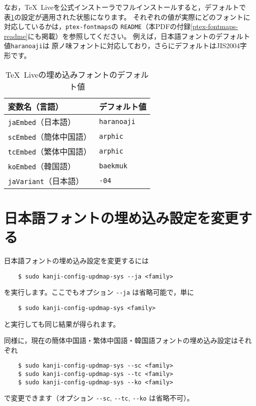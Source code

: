 \documentclass{jlreq}
\def\file#1{\texttt{#1}}
\def\command#1{\texttt{#1}}
\def\option#1{\texttt{-{}-#1}}
\def\TL{\TeX~Live}
\begin{document}
なお，\TL を公式インストーラでフルインストールすると，デフォルトで
表\ref{tldefault}の設定が適用された状態になります。
それぞれの値が実際にどのフォントに対応しているかは，\file{ptex-fontmaps}の
\file{README}（本PDFの付録\ref{ptex-fontmaps-readme}にも掲載）を参照してください。
例えば，日本語フォントのデフォルト値\command{haranoaji}は
原ノ味フォントに対応しており，さらにデフォルトはJIS2004字形です。
\begin{table}[h]
  \centering
  \caption{\TL の埋め込みフォントのデフォルト値}\label{tldefault}
  \begin{tabular}{m{}m{}}
  \hline
  変数名（言語）                  & デフォルト値        \\ \hline
  \command{jaEmbed}（日本語）     & \command{haranoaji} \\
  \command{scEmbed}（簡体中国語） & \command{arphic}    \\
  \command{tcEmbed}（繁体中国語） & \command{arphic}    \\
  \command{koEmbed}（韓国語）     & \command{baekmuk}   \\
  \command{jaVariant}（日本語）   & \command{-04}       \\ \hline
\end{tabular}
\end{table}


\clearpage


\section{日本語フォントの埋め込み設定を変更する}

日本語フォントの埋め込み設定を変更するには
\begin{verbatim}
    $ sudo kanji-config-updmap-sys --ja <family>
\end{verbatim}
を実行します。ここでもオプション \option{ja} は省略可能で，単に
\begin{verbatim}
    $ sudo kanji-config-updmap-sys <family>
\end{verbatim}
と実行しても同じ結果が得られます。

同様に，現在の簡体中国語・繁体中国語・韓国語フォントの埋め込み設定はそれぞれ
\begin{verbatim}
    $ sudo kanji-config-updmap-sys --sc <family>
    $ sudo kanji-config-updmap-sys --tc <family>
    $ sudo kanji-config-updmap-sys --ko <family>
\end{verbatim}
で変更できます（オプション \option{sc}, \option{tc}, \option{ko} は省略不可）。
\end{document}
